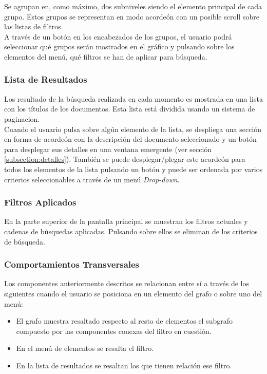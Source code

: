 Se agrupan en, como máximo, dos subniveles siendo el elemento principal de cada grupo. Estos grupos se representan en modo acordeón con un posible \gls{scroll} sobre las listas de filtros.\\

A través de un botón en los encabezados de los grupos, el usuario podrá seleccionar qué grupos serán mostrados en el gráfico y pulsando sobre los elementos del menú, qué filtros se han de aplicar para búsqueda.
 
\subsubsection{Lista de Resultados}
Los resultado de la búsqueda realizada en cada momento es mostrada en una lista con los títulos de los documentos. Esta lista está dividida usando un sistema de \gls{paginacion}.\\

Cuando el usuario pulsa sobre algún elemento de la lista, se despliega una sección en forma de acordeón con la descripción del documento seleccionado y un botón para desplegar sus detalles en una ventana emergente (ver sección \ref{subsection:detalles}). También se puede desplegar/plegar este acordeón para todos los elementos de la lista pulsando un botón y  puede ser ordenada por varios criterios seleccionables a través de un menú \textit{Drop-down}.

\subsubsection{Filtros Aplicados}
En la parte superior de la pantalla principal se muestran los filtros actuales y cadenas de búsquedas aplicadas. Pulsando sobre ellos se eliminan de los criterios de búsqueda.

\subsubsection{Comportamientos Transversales}
Los componentes anteriormente descritos se relacionan entre sí a través de los siguientes cuando el usuario se posiciona en un elemento del grafo o sobre uno del menú:
    \begin{itemize}
    	\item El grafo muestra resaltado respecto al resto de elementos el subgrafo compuesto por las componentes conexas del filtro en cuestión.
   		\item En el menú de elementos se resalta el filtro.
   		\item En la lista de resultados se resaltan los que tienen relación ese filtro.
   \end{itemize}

